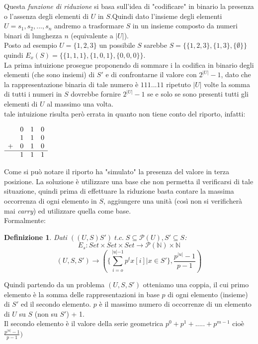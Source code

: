 \documentclass[a4paper]{article}
\newtheorem*{definition}{Definizione}
\begin{document}
Questa \textit{funzione di riduzione} si basa sull'idea di "codificare" in binario la presenza o l'assenza degli elementi di $U$ in $S$.Quindi dato l'insieme degli elementi $U={s_1, s_2,...,s_n}$ andremo a trasformare $S$ in un insieme composto da numeri binari di lunghezza $n$ (equivalente a $|U|$).\\
Posto ad esempio $U = \{1,2,3\}$ un possibile $S$ sarebbe $S= \{\{1,2,3\},\{1,3\},\{\emptyset\}\}$ quindi $E_x(S) = \{\{1,1,1\},\{1,0,1\},\{0,0,0\}\}$.\\
La prima intuizione prosegue proponendo di sommare i la codifica in binario degli elementi (che sono insiemi) di $S'$ e di confrontarne il valore con $2^{|U|}-1$, dato che la rappresentazione binaria di tale numero è $111...11$ ripetuto $|U|$ volte la somma di tutti i numeri in $S$ dovrebbe fornire $2^{|U|}-1$ se e solo se sono presenti tutti gli elementi di $U$ al massimo una volta.\\
tale intuizione risulta però errata in quanto non tiene conto del riporto, infatti:
\begin{center}$\begin{array}{llll}
  & 0 & 1  & 0  \\ 
  & 1 & 1  & 0  \\
+ &  0 & 1  & 0  \\
\hline
  &  1 & 1  & 1  \\
\end{array}$
\end{center}
Come si può notare il riporto ha "simulato" la presenza del valore in terza posizione.
La soluzione è utilizzare una base che non permetta il verificarsi di tale situazione, quindi prima di effettuare la riduzione basta contare la massima occorrenza di ogni elemento in $S$, aggiungere una unità (così non si verificherà mai \textit{carry}) ed utilizzare quella come base.
\\Formalmente:
\begin{definition}
	Dati $((U,S)S') \; t.c. \; S \subseteq \mathcal{P}(U), S' \subseteq S$:
	$$ E_s: Set \times Set \times Set \rightarrow \mathcal{P}(\mathbb{N}) \times \mathbb{N}$$
	$$(U,S,S') \rightarrow (\{\sum_{i=o}^{\rvert u \lvert -1} p^tx[i] | x \in S'\}, \frac{p^{\rvert u \lvert} -1}{p -1})$$
\end{definition}
Quindi partendo da un problema $(U,S,S')$ otteniamo una coppia, il cui primo elemento è la somma delle rappresentazioni in base $p$ di ogni elemento (insieme) di $S'$ ed il secondo elemento.
$p$ è il massimo numero di occorrenze di un elemento di $U$ su $S$ (non su $S'$) + 1.\\
Il secondo elemento è il valore della serie geometrica $p^0 + p^1 +.....+ p^{m-1}$ cioè $\frac{p^{\rvert u \lvert} -1}{p -1})$
\end{document}
